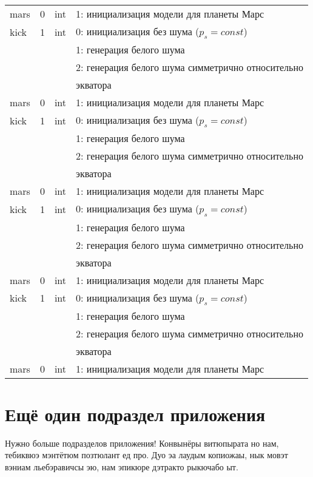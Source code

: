 \begin{longtable*}[c]{|l|c|l|l|}
    mars & 0 & int & 1: инициализация модели для планеты Марс     \\
    kick & 1 & int & 0: инициализация без шума (\(p_s = const\)) \\
    &   &     & 1: генерация белого шума                  \\
    &   &     & 2: генерация белого шума симметрично относительно \\
    & & & экватора    \\
    mars & 0 & int & 1: инициализация модели для планеты Марс     \\
    kick & 1 & int & 0: инициализация без шума (\(p_s = const\)) \\
    &   &     & 1: генерация белого шума                  \\
    &   &     & 2: генерация белого шума симметрично относительно \\
    & & & экватора    \\
    mars & 0 & int & 1: инициализация модели для планеты Марс     \\
    kick & 1 & int & 0: инициализация без шума (\(p_s = const\)) \\
    &   &     & 1: генерация белого шума                  \\
    &   &     & 2: генерация белого шума симметрично относительно \\
    & & & экватора    \\
    mars & 0 & int & 1: инициализация модели для планеты Марс     \\
    kick & 1 & int & 0: инициализация без шума (\(p_s = const\)) \\
    &   &     & 1: генерация белого шума                  \\
    &   &     & 2: генерация белого шума симметрично относительно \\
    & & & экватора    \\
    mars & 0 & int & 1: инициализация модели для планеты Марс     \\
    \hline
\end{longtable*}

\normalsize%
\section{Ещё один подраздел приложения}\label{app:B2}

Нужно больше подразделов приложения!
Конвынёры витюпырата но нам, тебиквюэ мэнтётюм позтюлант ед про. Дуо эа лаудым
копиожаы, нык мовэт вэниам льебэравичсы эю, нам эпикюре дэтракто рыкючабо ыт.

